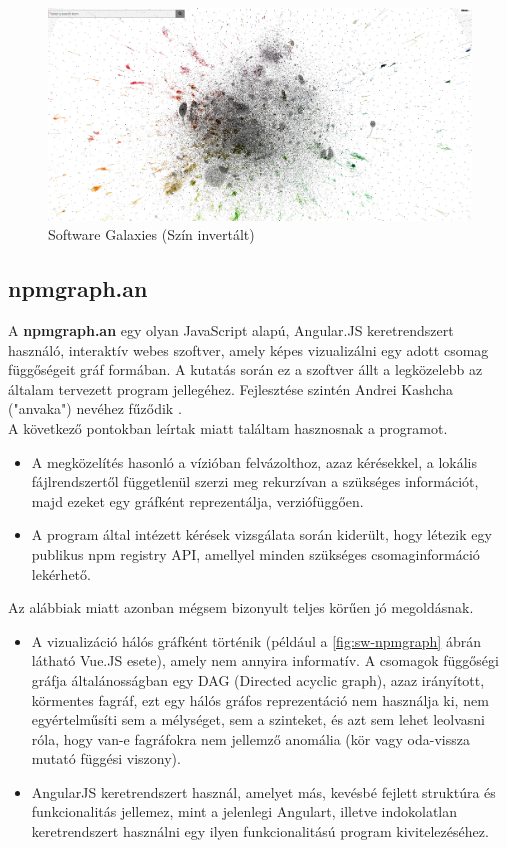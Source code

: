 	\begin{figure}[!h]
		\centering
		\includegraphics[scale=0.1]{images/anvaka_pm.png}
		\caption{Software Galaxies (Szín invertált) \cite{sw-galaxies}}
		\label{fig:sw-galaxies}
	\end{figure}
	
	\subsection{npmgraph.an}
	
	A \textbf{npmgraph.an} egy olyan JavaScript alapú, Angular.JS keretrendszert használó, interaktív webes szoftver, amely képes vizualizálni egy adott csomag függőségeit gráf formában. A kutatás során ez a szoftver állt a legközelebb az általam tervezett program jellegéhez. Fejlesztése szintén Andrei Kashcha ("anvaka") nevéhez fűződik \cite{anvaka-npmgraph}.\\
	
	A következő pontokban leírtak miatt találtam hasznosnak a programot.
	\begin{itemize}
		\item A megközelítés hasonló a vízióban felvázolthoz, azaz kérésekkel, a lokális fájlrendszertől függetlenül szerzi meg rekurzívan a szükséges információt, majd ezeket egy gráfként reprezentálja, verziófüggően.
		\item A program által intézett kérések vizsgálata során kiderült, hogy létezik egy publikus npm registry API, amellyel minden szükséges csomaginformáció lekérhető.
	\end{itemize}
	
	Az alábbiak miatt azonban mégsem bizonyult teljes körűen jó megoldásnak. 
	\begin{itemize}
		\item A vizualizáció hálós gráfként történik (például a \ref{fig:sw-npmgraph} ábrán látható Vue.JS esete), amely nem annyira informatív. A csomagok függőségi gráfja általánosságban egy DAG (Directed acyclic graph), azaz irányított, körmentes fagráf, ezt egy hálós gráfos reprezentáció nem használja ki, nem egyértelműsíti sem a mélységet, sem a szinteket, és azt sem lehet leolvasni róla, hogy van-e fagráfokra nem jellemző anomália (kör vagy oda-vissza mutató függési viszony).
		\item AngularJS keretrendszert használ, amelyet más, kevésbé fejlett struktúra és funkcionalitás jellemez, mint a jelenlegi Angulart, illetve indokolatlan keretrendszert használni egy ilyen funkcionalitású program kivitelezéséhez.  
	\end{itemize}
	
